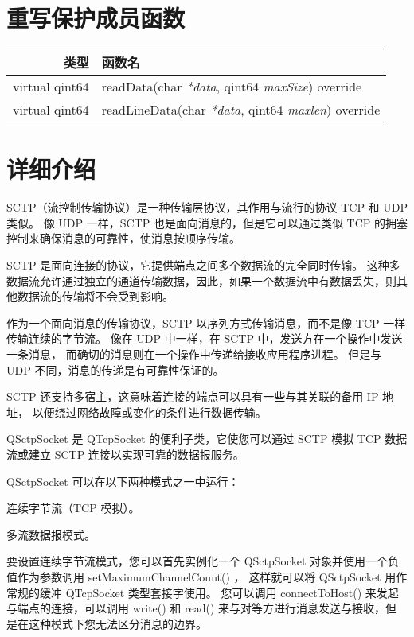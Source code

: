\section{重写保护成员函数}

\begin{tabular}{|r|l|}
	\hline 
	类型	& 函数名 \\ 
	\hline
	virtual qint64	& readData(char \emph{*data}, qint64 \emph{maxSize}) override \\ 
	\hline
    virtual qint64	& readLineData(char \emph{*data}, qint64 \emph{maxlen}) override \\ 
	\hline
\end{tabular}

\section{详细介绍}

SCTP（流控制传输协议）是一种传输层协议，其作用与流行的协议 TCP 和 UDP 类似。 
像 UDP 一样，SCTP 也是面向消息的，但是它可以通过类似 TCP 的拥塞控制来确保消息的可靠性，使消息按顺序传输。

SCTP 是面向连接的协议，它提供端点之间多个数据流的完全同时传输。 
这种多数据流允许通过独立的通道传输数据，因此，如果一个数据流中有数据丢失，则其他数据流的传输将不会受到影响。

作为一个面向消息的传输协议，SCTP 以序列方式传输消息，而不是像 TCP 一样传输连续的字节流。 
像在 UDP 中一样，在 SCTP 中，发送方在一个操作中发送一条消息，
而确切的消息则在一个操作中传递给接收应用程序进程。
 但是与 UDP 不同，消息的传递是有可靠性保证的。

SCTP 还支持多宿主，这意味着连接的端点可以具有一些与其关联的备用 IP 地址，
以便绕过网络故障或变化的条件进行数据传输。

QSctpSocket 是 QTcpSocket 的便利子类，它使您可以通过 SCTP 模拟 TCP 数据流或建立 SCTP 连接以实现可靠的数据报服务。

QSctpSocket 可以在以下两种模式之一中运行：

\begin{compactitem}[\arr]
\item 连续字节流（TCP 模拟）。
\item 多流数据报模式。
\end{compactitem}

要设置连续字节流模式，您可以首先实例化一个 QSctpSocket 对象并使用一个负值作为参数调用 setMaximumChannelCount() ，
这样就可以将 QSctpSocket 用作常规的缓冲 QTcpSocket 类型套接字使用。 
您可以调用 connectToHost() 来发起与端点的连接，可以调用 write() 和 read() 来与对等方进行消息发送与接收，但是在这种模式下您无法区分消息的边界。

